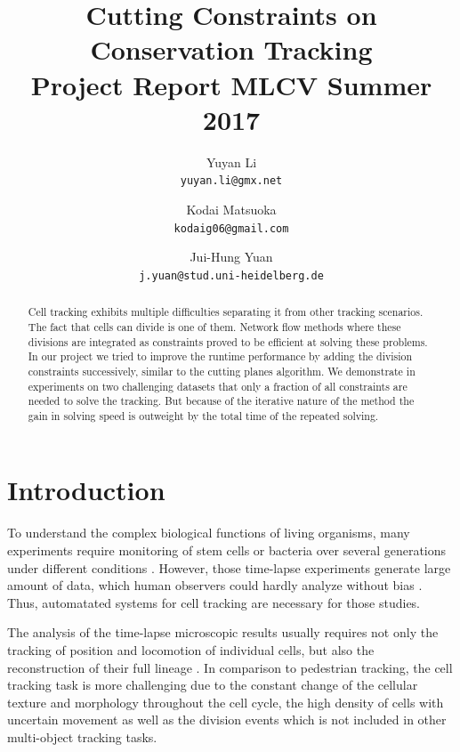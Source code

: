 \documentclass[10pt,twocolumn,letterpaper]{article}
\begin{document}
\title{Cutting Constraints on Conservation Tracking\\
  \large{Project Report MLCV Summer 2017}
}

\author{
Yuyan Li\\
{\tt\small yuyan.li@gmx.net}
\and
Kodai Matsuoka\\
{\tt\small kodaig06@gmail.com}
\and
Jui-Hung Yuan\\
{\tt\small j.yuan@stud.uni-heidelberg.de}
}

\maketitle

\begin{abstract}
  Cell tracking exhibits multiple difficulties separating it from other tracking scenarios. The fact that cells can divide is one of them. Network flow methods where these divisions are integrated as constraints proved to be efficient at solving these problems. In our project we tried to improve the runtime performance by adding the division constraints successively, similar to the cutting planes algorithm. We demonstrate in experiments on two challenging datasets that only a fraction of all constraints are needed to solve the tracking. But because of the iterative nature of the method the gain in solving speed is outweight by the total time of the repeated solving.
\end{abstract}

\section{Introduction}

To understand the complex biological functions of living organisms, many experiments require monitoring of stem cells or bacteria over several generations under different conditions  \cite{elowitz2002stochastic, schroeder2011long}. However, those time-lapse experiments generate large amount of data, which human observers could hardly analyze without bias \cite{wu2010microscope}. Thus, automatated systems for cell tracking are necessary for those studies.

The analysis of the time-lapse microscopic results usually requires not only the tracking of position and locomotion of individual cells, but also the reconstruction of their full lineage \cite{amat2013towards}. In comparison to pedestrian tracking, the cell tracking task is more challenging due to the constant change of the cellular texture and morphology throughout the cell cycle, the high density of cells with uncertain movement as well as the division events which is not included in other multi-object tracking tasks.
\end{document}
